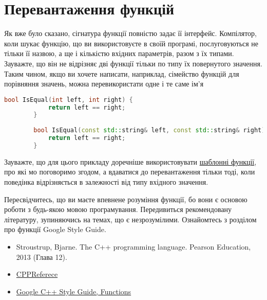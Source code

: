 \documentclass[12pt]{article}
\begin{document}
	\section{Перевантаження функцій}
	Як вже було сказано, сігнатура функції повністю задає її інтерфейс. Компілятор, коли шукає функцію, що ви використовуєте в своїй програмі, послуговуються не тільки її назвою, а ще і кількістю вхідних параметрів, разом з їх типами. Зауважте, що він не відрізняє дві функції тільки по типу їх повернутого значення. Таким чином, якщо ви хочете написати, наприклад, сімейство функцій для порівняння значень, можна перевикористати одне і те саме ім'я
	\begin{lstlisting}[language=c++]
		bool IsEqual(int left, int right) {
			return left == right; 
		}
		
		bool IsEqual(const std::string& left, const std::string& right) {
			return left == right; 
		}
	\end{lstlisting}
	Зауважте, що для цього прикладу доречніше використовувати \href{https://en.cppreference.com/w/cpp/language/templates}{шаблонні функції}, про які мо поговоримо згодом, а вдаватися до перевантаження тільки тоді, коли поведінка відрізняється в залежності від типу вхідного значення.

	Пересвідчитесь, що ви маєте впевнене розуміння функції, бо вони є основою роботи з будь-якою мовою програмування. Передивиться рекомендовану літературу, зупиняючись на темах, що є незрозумілими. Ознайомтесь з розділом про функції Google Style Guide.

	
	\begin{itemize}
		\item Stroustrup, Bjarne. The C++ programming language. Pearson Education, 2013 (Глава 12).
		\item \href{https://en.cppreference.com/w/cpp/language/functions}{CPPReferece}
		\item \href{https://google.github.io/styleguide/cppguide.html#Functions}{Google C++ Style Guide, Functions}
	\end{itemize}
\end{document}
